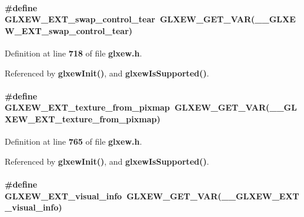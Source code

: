 \paragraph[{G\+L\+X\+E\+W\+\_\+\+E\+X\+T\+\_\+swap\+\_\+control\+\_\+tear}]{\setlength{\rightskip}{0pt plus 5cm}\#define G\+L\+X\+E\+W\+\_\+\+E\+X\+T\+\_\+swap\+\_\+control\+\_\+tear~{\bf G\+L\+X\+E\+W\+\_\+\+G\+E\+T\+\_\+\+V\+AR}({\bf \+\_\+\+\_\+\+G\+L\+X\+E\+W\+\_\+\+E\+X\+T\+\_\+swap\+\_\+control\+\_\+tear})}\label{glxew_8h_a606c450a0095cc740461fbfe741d2d2a}


Definition at line {\bf 718} of file {\bf glxew.\+h}.



Referenced by {\bf glxew\+Init()}, and {\bf glxew\+Is\+Supported()}.

\paragraph[{G\+L\+X\+E\+W\+\_\+\+E\+X\+T\+\_\+texture\+\_\+from\+\_\+pixmap}]{\setlength{\rightskip}{0pt plus 5cm}\#define G\+L\+X\+E\+W\+\_\+\+E\+X\+T\+\_\+texture\+\_\+from\+\_\+pixmap~{\bf G\+L\+X\+E\+W\+\_\+\+G\+E\+T\+\_\+\+V\+AR}({\bf \+\_\+\+\_\+\+G\+L\+X\+E\+W\+\_\+\+E\+X\+T\+\_\+texture\+\_\+from\+\_\+pixmap})}\label{glxew_8h_a3930c9b853a50cc07a050b2e4fa7ff46}


Definition at line {\bf 765} of file {\bf glxew.\+h}.



Referenced by {\bf glxew\+Init()}, and {\bf glxew\+Is\+Supported()}.

\paragraph[{G\+L\+X\+E\+W\+\_\+\+E\+X\+T\+\_\+visual\+\_\+info}]{\setlength{\rightskip}{0pt plus 5cm}\#define G\+L\+X\+E\+W\+\_\+\+E\+X\+T\+\_\+visual\+\_\+info~{\bf G\+L\+X\+E\+W\+\_\+\+G\+E\+T\+\_\+\+V\+AR}({\bf \+\_\+\+\_\+\+G\+L\+X\+E\+W\+\_\+\+E\+X\+T\+\_\+visual\+\_\+info})}\label{glxew_8h_a63ae5121c7f134cd083c5c57caa5216b}


